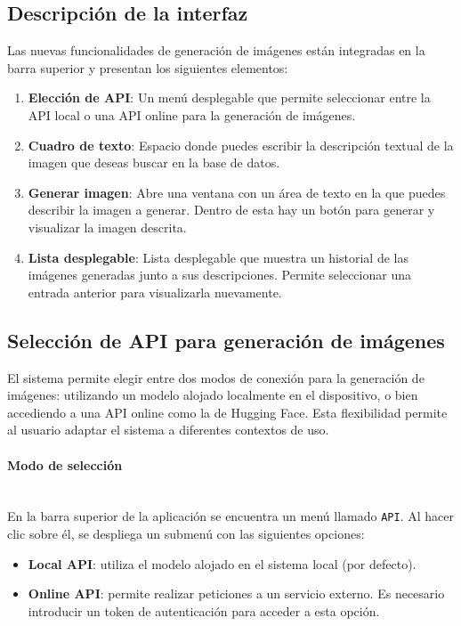 \subsection{Descripción de la interfaz} 
Las nuevas funcionalidades de generación de imágenes están integradas en la barra superior y presentan los siguientes elementos:
\begin{enumerate}
    \item \textbf{Elección de API}: Un menú desplegable que permite seleccionar entre la API local o una API online para la generación de imágenes.
    \item \textbf{Cuadro de texto}: Espacio donde puedes escribir la descripción textual de la imagen que deseas buscar en la base de datos.
    \item \textbf{Generar imagen}: Abre una ventana con un área de texto en la que puedes describir la imagen a generar. Dentro de esta hay un botón para generar y visualizar la imagen descrita.
    \item \textbf{Lista desplegable}: Lista desplegable que muestra un historial de las imágenes generadas junto a sus descripciones. Permite seleccionar una entrada anterior para visualizarla nuevamente.
\end{enumerate}


\subsection{Selección de API para generación de imágenes}

El sistema permite elegir entre dos modos de conexión para la generación de imágenes: utilizando un modelo alojado localmente en el dispositivo, o bien accediendo a una API online como la de Hugging Face. Esta flexibilidad permite al usuario adaptar el sistema a diferentes contextos de uso.

\paragraph{\textbf{Modo de selección}} \mbox{}\\[0.5em]
En la barra superior de la aplicación se encuentra un menú llamado \texttt{API}. Al hacer clic sobre él, se despliega un submenú con las siguientes opciones:

\begin{itemize}
\item \textbf{Local API}: utiliza el modelo alojado en el sistema local (por defecto).
\item \textbf{Online API}: permite realizar peticiones a un servicio externo. Es necesario introducir un token de autenticación para acceder a esta opción.
\end{itemize}

